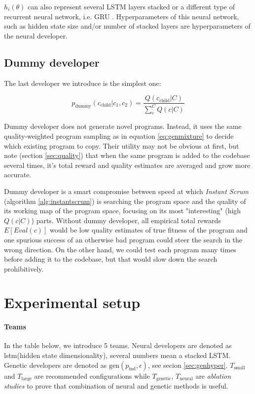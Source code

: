 $h_i(\theta)$ can also represent several LSTM layers stacked or a different type of recurrent neural network, i.e. GRU \cite{choPropertiesNeuralMachine2014,chung2014empirical}.
Hyperparameters of this neural network, such as hidden state size and/or number of stacked layers are hyperparameters of the neural developer.  

\newpage \subsection{Dummy developer}

The last developer we introduce is the simplest one:

\begin{equation}
    p_\text{dummy}(c_\text{child}|c_1,c_2) = 
    \frac{Q(c_\text{child}|C)}{\sum\limits_{c}^{C} Q(c|C)} 
    \label{eq:dummy}
\end{equation}

Dummy developer does not generate novel programs.
Instead, it uses the same quality-weighted program sampling as in equation \ref{eq:genmixture} to decide which existing program to copy.
Their utility may not be obvious at first, but note (section \ref{sec:quality}) that when the same program is added to the codebase several times, it's total reward and quality estimates are averaged and grow more accurate.

Dummy developer is a smart compromise between speed at which \emph{Instant Scrum} (algorithm \ref{alg:instantscrum}) is searching the program space and the quality of its working map of the program space, focusing on its most "interesting" (high $Q(c|C)$) parts. 
Without dummy developer, all empirical total rewards $E[Eval(c)]$ would be low quality estimates of true fitness of the program and one spurious success of an otherwise bad program could steer the search in the wrong direction.
On the other hand, we could test each program many times before adding it to the codebase, but that would slow down the search prohibitively. 

\newpage
\section{Experimental setup}
\label{sec:neurogen-experiments}

\paragraph{Teams}

In the table below, we introduce 5 teams.
Neural developers are denoted as lstm(hidden state dimensionality), several numbers mean a stacked LSTM.
Genetic developers are denoted as $\text{gen}(p_\text{ind},\epsilon)$, see secion \ref{sec:genhyper}.
$T_\text{small}$ and $T_\text{large}$ are recommended configurations while $T_\text{genetic}$, $T_\text{neural}$ are \emph{ablation studies} to prove that combination of neural and genetic methods is useful.

